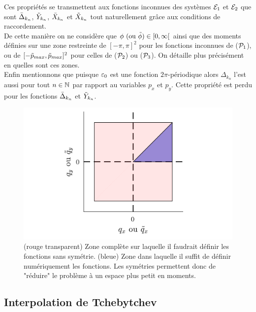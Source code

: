 \documentclass[10.5pt]{article}
\begin{document}
\begin{multicols}{2}
Ces propriétés se transmettent aux fonctions inconnues des systèmes $\mathcal{E}_1$ et $\mathcal{E}_2$ que sont $\bar{\Delta}_{k_n}$, $\tilde{Y}_{k_n}$, $\bar{X}_{k_n}$ et $\tilde{X}_{k_n}$ tout naturellement grâce aux conditions de raccordement.\\
\indent
De cette manière on ne considère que $\phi \text{ (ou } \tilde{\phi}) \in [0, \infty[$ ainsi que des moments définies sur une zone restreinte de $[-\pi, \pi]^2$ pour les fonctions inconnues de ($\mathcal{P}_1$), ou de $[-\tilde{p}_{max}, \tilde{p}_{max}]^2$ pour celles de ($\mathcal{P}_2$) ou ($\mathcal{P}_3$). On détaille plus précisément en  quelles sont ces zones. \\


 Enfin mentionnons que puisque $\varepsilon_0$ est une fonction $2\pi$-périodique alors $\Delta_{k_n}$ l'est aussi pour tout $n\in\mathbb{N}$ par rapport au variables $p_x$ et $p_y$. Cette propriété est perdu pour les fonctions $\bar{\Delta}_{k_n}$ et $\tilde{Y}_{k_n}$.


\begin{figure}[H]
\begin{center}
	\includegraphics[width=0.95\columnwidth]{SurfUtile.pdf}
\end{center}
\vspace*{-22pt}
\caption{(rouge transparent) Zone complète sur laquelle il faudrait définir les fonctions sans symétrie. (bleue) Zone dans laquelle il suffit de définir numériquement les fonctions. Les symétries permettent donc de "réduire" le problème à un espace plus petit en moments.}
\label{fig:SurfUtile}
\end{figure}


\subsection{Interpolation de Tchebytchev}


\end{multicols}
\end{document}
